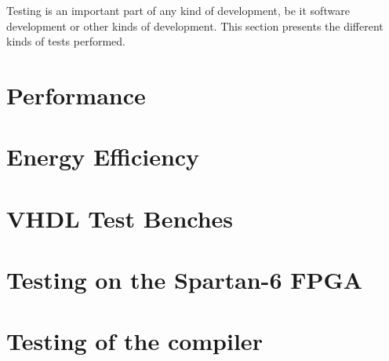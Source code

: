 Testing is an important part of any kind of development, be it software development or other kinds of development.
This section presents the different kinds of tests performed.

\section{Performance}


\section{Energy Efficiency}


\section{VHDL Test Benches}


\section{Testing on the Spartan-6 FPGA}


\section{Testing of the compiler}

